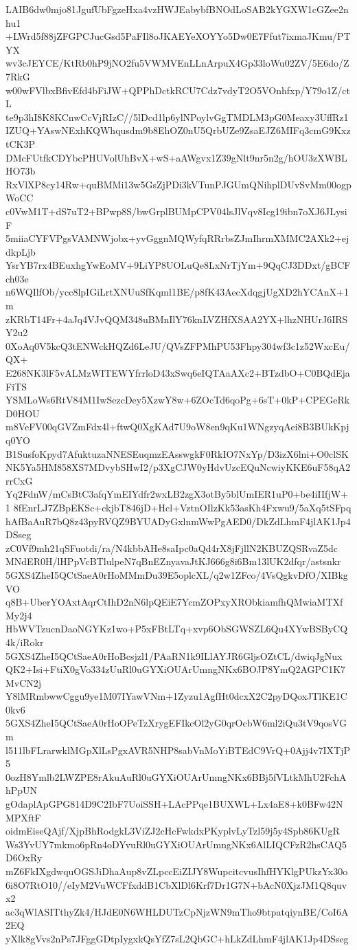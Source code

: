 LAIB6dw0mjo81JgufUbFgzeHxa4vzHWJEabybfBNOdLoSAB2kYGXW1cGZee2nhu1
+LWrd5f88jZFGPCJucGsd5PaFIl8oJKAEYeXOYYo5Dw0E7Ffut7ixmaJKmu/PTYX
wv3cJEYCE/KtRb0hP9jNO2fu5VWMVEnLLnArpuX4Gp33loWu02ZV/5E6do/Z7RkG
w00wFVlbxBfivEfd4bFiJW+QPPhDctkRCU7Cdz7vdyT2O5VOnhfxp/Y79o1Z/ctL
te9p3hI8K8KCnwCcVjRIzC//5lDcd1lp6ylNPoylvGgTMDLM3pG0Meaxy3UffRz1
IZUQ+YAswNExhKQWhqusdm9b8EhOZ0nU5QrbUZe9ZsaEJZ6MIFq3cmG9KxztCK3P
DMcFUtfkCDYbcPHUVolUhBvX+wS+aAWgvx1Z39gNlt9nr5n2g/hOU3zXWBLHO73b
RxVlXP8cy14Rw+quBMMi13w5GsZjPDi3kVTunPJGUmQNihplDUvSvMm00ogpWoCC
c0VwM1T+dS7uT2+BPwp8S/bwGrplBUMpCPV04lsJlVqv8Icg19ibn7oXJ6JLysiF
5miiaCYFVPgsVAMNWjobx+yvGggnMQWyfqRRrbsZJmIhrmXMMC2AXk2+ejdkpLjb
YsrYB7rx4BEuxhgYwEoMV+9LiYP8UOLuQe8LxNrTjYm+9QqCJ3DDxt/gBCFch03e
n6WQIlfOb/ycc8lpIGiLrtXNUuSfKqml1BE/p8fK43AecXdqgjUgXD2hYCAnX+1m
zKRbT14Fr+4aJq4VJvQQM348uBMnIlY76knLVZHfXSAA2YX+lhzNHUrJ6IRSY2u2
0XoAq0V5kcQ3tENWckHQZd6LeJU/QVsZFPMhPU53Fhpy304wf3c1z52WxcEu/QX+
E268NK3lF5vALMzWITEWYfrrloD43xSwq6eIQTAaAXc2+BTzdbO+C0BQdEjaFiTS
YSMLoWs6RtV84M1IwSezcDey5XzwY8w+6ZOcTd6qoPg+6sT+0kP+CPEGeRkD0HOU
m8VeFV00qGVZmFdx4l+ftwQ0XgKAd7U9oW8en9qKu1WNgzyqAei8B3BUkKpjq0YO
B1SusfoKpyd7AfuktuzaNNESEuqmzEAsswgkF0RkIO7NxYp/D3izX6lni+O0clSK
NK5Ya5HM858XS7MDvybSHwI2/p3XgCJW0yHdvUzcEQuNcwiyKKE6uF58qA2rrCxG
Yq2FdnW/mCsBtC3afqYmEIYdfr2wxLB2zgX3otBy5blUmIER1uP0+be4iIIfjW+1
8fEnrLJ7ZBpEKSc+ckjbT846jD+Hcl+VztnOIlzKk53asKh4Fxwu9/5aXq5tSFpq
hAfBaAuR7bQ8z43pyRVQZ9BYUADyGxlnmWwPgAED0/DkZdLhmF4jlAK1Jp4DSseg
zC0Vf9mh21qSFuotdi/ra/N4kbbAHe8saIpc0aQd4rX8jFjllN2KBUZQSRvaZ5dc
MNdER0H/lHPpVcBTlulpeN7qBnEZnyavaJtKJ666g8i6Bm13lUK2dfqr/astsnkr
5GXS4ZheI5QCtSaeA0rHoMMmDu39E5oplcXL/q2w1ZFco/4VsQgkvDfO/XIBkgVO
q8B+UberYOAxtAqrCtIhD2nN6lpQEiE7YcmZOPxyXRObkiamfhQMwiaMTXfMy2j4
HbWVTzucnDaoNGYKz1wo+P5xFBtLTq+xvp6ObSGWSZL6Qu4XYwBSByCQ4k/iRokr
5GXS4ZheI5QCtSaeA0rHoBcsjzl1/PAaRN1k9ILlAYJR6GljsOZtCL/dwiqJgNux
QK2+Isi+FtiX0gVo334zUuRl0uGYXiOUArUmngNKx6BOJP8YmQ2AGPC1K7MvCN2j
Y8lMRmbwwCggu9ye1M07IYawVNm+1Zyzu1AgfHt0dcxX2C2pyDQoxJTlKE1C0kv6
5GXS4ZheI5QCtSaeA0rHoOPeTzXrygEFIkcOl2yG0qrOcbW6ml2iQu3tV9qosVGm
l511lbFLrarwklMGpXlLsPgxAVR5NHP8sabVnMoYiBTEdC9VrQ+0Ajj4v7IXTjP5
0ozH8Ymlb2LWZPE8rAkuAuRl0uGYXiOUArUmngNKx6BBj5fVLtkMhU2FchAhPpUN
gOdaplApGPG814D9C2IbF7UoiSSH+LAcPPqe1BUXWL+Lx4aE8+k0BFw42NMPXftF
oidmEiseQAjf/XjpBhRodgkL3ViZJ2cHcFwkdxPKyplvLyTzl59j5y4Spb86KUgR
Ws3YvUY7mkmo6pRn4oDYvuRl0uGYXiOUArUmngNKx6AlLIQCFzR2hsCAQ5D6OxRy
mZ6FkIXgdwquOGSJiDhaAup8vZLpccEiZIJY8WupcitcvusIhfHYKlgPUkzYx30o
6i8O7RtO10//eIyM2VuWCFfxddB1CbXlDl6Krf7Dr1G7N+bAcN0XjzJM1Q8quvx2
ac3qWlASITthyZk4/HJdE0N6WHLDUTzCpNjzWN9mTho9btpatqiynBE/CoI6A2EQ
yXlk8gVvs2nPs7JFggGDtpIygxkQsYfZ7sL2QbGC+hLkZdLhmF4jlAK1Jp4DSseg
